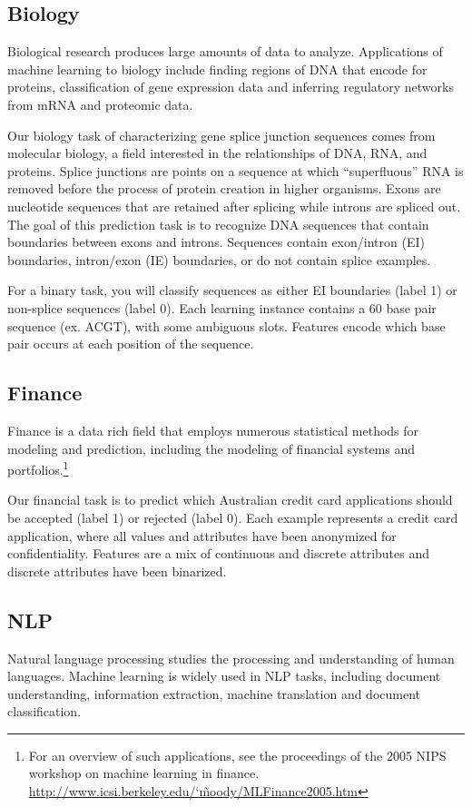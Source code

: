 \documentclass[11pt]{article}
\begin{document}
\subsection{Biology}
	Biological research produces large amounts of data to analyze. Applications of machine learning to biology include finding regions of DNA that encode for proteins, classification of gene expression data and inferring regulatory networks from mRNA and proteomic data.
	
	Our biology task of characterizing gene splice junction sequences comes from molecular biology, a field interested in the relationships of DNA, RNA, and proteins. Splice junctions are points on a sequence at which ``superfluous'' RNA is removed before the process of protein creation in higher organisms. Exons are nucleotide sequences that are retained after splicing while introns are spliced out. The goal of this prediction task is to recognize DNA sequences that contain boundaries between exons and introns. Sequences contain exon/intron (EI) boundaries, intron/exon (IE) boundaries, or do not contain splice examples.
		
	For a binary task, you will classify sequences as either EI boundaries (label 1) or non-splice sequences (label 0). Each learning instance contains a 60 base pair sequence (ex. ACGT), with some ambiguous slots. Features encode which base pair occurs at each position of the sequence.

\subsection{Finance}
Finance is a data rich field that employs numerous statistical methods for modeling and prediction, including the modeling of financial systems and portfolios.\footnote{For an overview of such applications, see the proceedings of the 2005 NIPS workshop on machine learning in finance. \href{http://www.icsi.berkeley.edu/~moody/MLFinance2005.htm}{http://www.icsi.berkeley.edu/\char`\~moody/MLFinance2005.htm}}

Our financial task is to predict which Australian credit card applications should be accepted (label 1) or rejected (label 0). Each example represents a credit card application, where all values and attributes have been anonymized for confidentiality. Features are a mix of continuous and discrete attributes and discrete attributes have been binarized.

\subsection{NLP}
Natural language processing studies the processing and understanding of human languages. Machine learning is widely used in NLP tasks, including document understanding, information extraction, machine translation and document classification.
\end{document}
